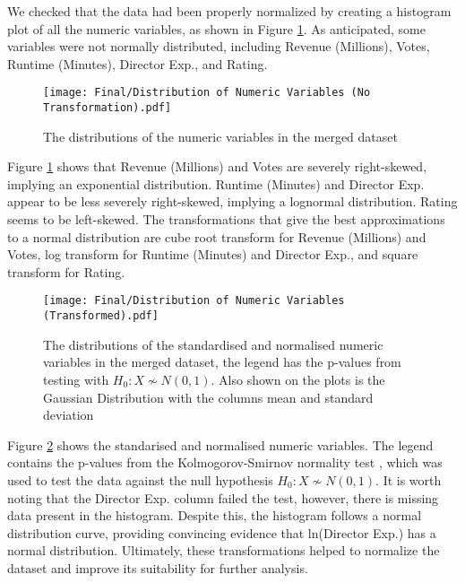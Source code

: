         We checked that the data had been properly normalized by creating a
        histogram plot of all the numeric variables, as shown in Figure
        \ref*{fig-distribution-of-numeric-variable}. As anticipated, some
        variables were not normally distributed, including Revenue (Millions),
        Votes, Runtime (Minutes), Director Exp., and Rating.
        \begin{figure}[H]
            \centering
            \texttt{[image: Final/Distribution of Numeric Variables (No Transformation).pdf]}
            \caption[short]{The distributions of the numeric variables in the merged dataset}\label{fig-distribution-of-numeric-variable}
        \end{figure}
        Figure \ref*{fig-distribution-of-numeric-variable} shows that Revenue (Millions) and Votes are
        severely right-skewed, implying an exponential distribution. Runtime
        (Minutes) and Director Exp. appear to be less severely right-skewed,
        implying a lognormal distribution. Rating seems to be left-skewed. The
        transformations that give the best approximations to a normal
        distribution are cube root transform for Revenue (Millions) and Votes,
        log transform for Runtime (Minutes) and Director Exp., and square
        transform for Rating.
        \begin{figure}[H]
            \centering
            \texttt{[image: Final/Distribution of Numeric Variables (Transformed).pdf]}
            \caption[short]{The distributions of the standardised and normalised numeric variables in the merged dataset,
                            the legend has the p-values from testing with $H_{0}: X \not\sim N(0,1)$. Also shown on the plots is
                            the Gaussian Distribution with the columns mean and standard deviation}\label{fig-transformed-distribution-of-numeric-variable}
        \end{figure}
        Figure \ref*{fig-transformed-distribution-of-numeric-variable} shows the
        standarised and normalised numeric variables. The legend contains the p-values
        from the Kolmogorov-Smirnov normality test \cite*{KStest}, which was used to
        test the data against the null hypothesis $H_{0}: X \not\sim N(0,1)$. It is
        worth noting that the Director Exp. column failed the test, however, there is
        missing data present in the histogram. Despite this, the histogram follows a
        normal distribution curve, providing convincing evidence that ln(Director Exp.)
        has a normal distribution. Ultimately, these transformations helped to normalize
        the dataset and improve its suitability for further analysis.